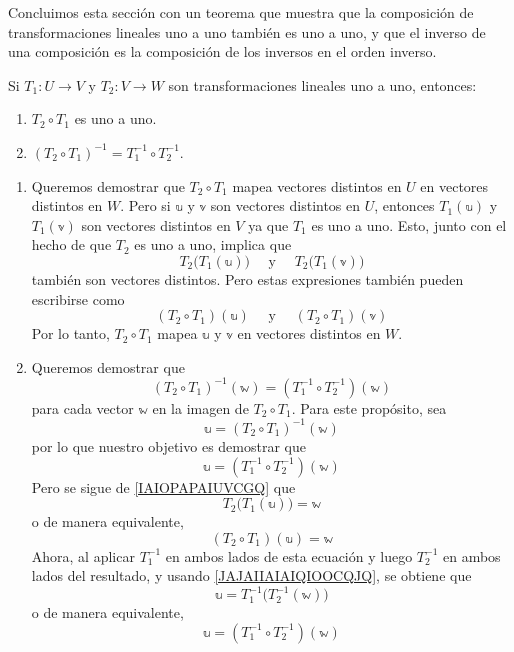 Concluimos esta sección con un teorema que muestra que la composición de transformaciones lineales uno a uno también es uno a uno, y que el inverso de una composición es la composición de los inversos en el orden inverso.

\begin{theorem}
    Si $T_1: U \longrightarrow V$ y $T_2: V \longrightarrow W$ son transformaciones lineales uno a uno, entonces:
    \begin{enumerate}[label=\alph*)]
        \item $T_2 \circ T_1$ es uno a uno.
        \item $(T_2 \circ T_1)^{-1} = T_1^{-1} \circ T_2^{-1}$.
    \end{enumerate}
    \demostracion
    \begin{enumerate}[label=\alph*)]
        \item Queremos demostrar que $T_2 \circ T_1$ mapea vectores distintos en $U$ en vectores distintos en $W$. Pero si $\mathbb{u}$ y $\mathbb{v}$ son vectores distintos en $U$, entonces $T_1(\mathbb{u})$ y $T_1(\mathbb{v})$ son vectores distintos en $V$ ya que $T_1$ es uno a uno. Esto, junto con el hecho de que $T_2$ es uno a uno, implica que
        $$T_2\big(T_1(\mathbb{u})\big) \quad \text{ y } \quad T_2\big(T_1(\mathbb{v})\big)$$
        también son vectores distintos. Pero estas expresiones también pueden escribirse como
        $$(T_2 \circ T_1)(\mathbb{u}) \quad \text{ y } \quad (T_2 \circ T_1)(\mathbb{v})$$
        Por lo tanto, $T_2 \circ T_1$ mapea $\mathbb{u}$ y $\mathbb{v}$ en vectores distintos en $W$.
        \item Queremos demostrar que
        $$(T_2 \circ T_1)^{-1}(\mathbb{w}) = (T_1^{-1} \circ T_2^{-1})(\mathbb{w})$$
        para cada vector $\mathbb{w}$ en la imagen de $T_2 \circ T_1$. Para este propósito, sea
        \begin{equation}
            \mathbb{u} = (T_2 \circ T_1)^{-1}(\mathbb{w}) \label{IAIOPAPAIUVCGQ}
        \end{equation}
        por lo que nuestro objetivo es demostrar que
        $$\mathbb{u} = (T_1^{-1} \circ T_2^{-1})(\mathbb{w})$$
        Pero se sigue de \eqref{IAIOPAPAIUVCGQ} que
        $$T_2\big(T_1(\mathbb{u})\big) = \mathbb{w}$$
        o de manera equivalente,
        $$(T_2 \circ T_1)(\mathbb{u}) = \mathbb{w}$$
        Ahora, al aplicar $T_1^{-1}$ en ambos lados de esta ecuación y luego $T_2^{-1}$ en ambos lados del resultado, y usando \eqref{JAJAIIAIAIQIOOCQJQ}, se obtiene que
        $$\mathbb{u} = T_1^{-1}\big(T_2^{-1}(\mathbb{w})\big)$$
        o de manera equivalente,
        $$\mathbb{u} = (T_1^{-1} \circ T_2^{-1})(\mathbb{w})$$
    \end{enumerate}
\end{theorem}

